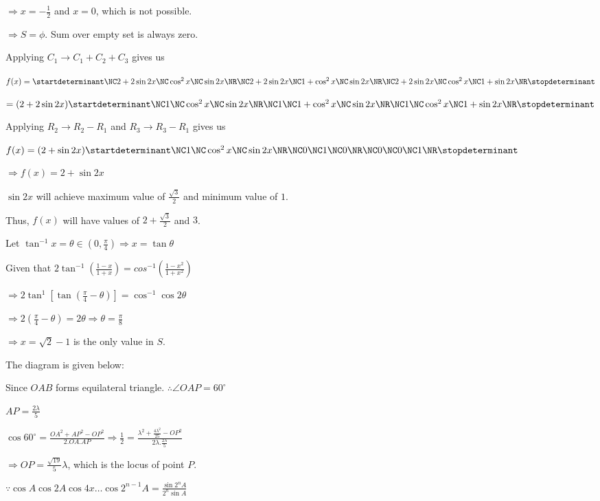   $\Rightarrow x = -\frac{1}{2}$ and $x = 0$, which is not possible.

  $\Rightarrow S = \phi$. Sum over empty set is always zero.
\item Applying $C_1\rightarrow C_1 + C_2 + C_3$ gives us

  $f(x) = \startdeterminant\NC 2 +2\sin2x\NC \cos^2x\NC\sin2x\NR\NC 2 + 2\sin2x\NC 1
  + \cos^2x\NC\sin2x \NR\NC 2 + 2\sin2x\NC \cos^2x\NC 1 + \sin2x\NR\stopdeterminant$

  $= (2 + 2\sin2x)\startdeterminant\NC 1\NC \cos^2x\NC\sin2x\NR\NC 1\NC 1
  + \cos^2x\NC\sin2x \NR\NC 1\NC \cos^2x\NC 1 + \sin2x\NR\stopdeterminant$

  Applying $R_2\rightarrow R_2 - R_1$ and $R_3\rightarrow R_3 - R_1$ gives us

  $f(x) = (2 + \sin2x)\startdeterminant\NC 1\NC \cos^2x\NC \sin2x\NR\NC 0\NC 1\NC 0\NR\NC 0\NC 0\NC
  1\NR\stopdeterminant$

  $\Rightarrow f(x) = 2 + \sin2x$

  $\sin2x$ will achieve maximum value of $\frac{\sqrt{3}}{2}$ and minimum value of $1$.

  Thus, $f(x)$ will have values of $2 + \frac{\sqrt{3}}{2}$ and $3$.
\item Let $\tan^{-1}x = \theta\in\left(0, \frac{\pi}{4}\right)\Rightarrow x = \tan\theta$

  Given that $2\tan^{-1}\left(\frac{1 - x}{1 + x}\right)= cos^{-1}\left(\frac{1 - x^2}{1 + x^2}\right)$

  $\Rightarrow 2\tan^{1}\left[\tan\left(\frac{\pi}{4} - \theta\right)\right] = \cos^{-1}\cos2\theta$

  $\Rightarrow 2\left(\frac{\pi}{4} - \theta\right) = 2\theta \Rightarrow \theta = \frac{\pi}{8}$

  $\Rightarrow x = \sqrt{2} - 1$ is the only value in $S$.
\item The diagram is given below:

  \startplacefigure
    \externalfigure[17_31.pdf]
  \stopplacefigure

  Since $OAB$ forms equilateral triangle. $\therefore \angle OAP = 60^\circ$

  $AP = \frac{2\lambda}{5}$

  $\cos60^\circ = \frac{OA^2 + AP^2 - OP^2}{2.OA.AP} \Rightarrow \frac{1}{2} = \frac{\lambda^2
    + \frac{4\lambda^2}{25} - OP^2}{2\lambda.\frac{2\lambda}{5}}$

  $\Rightarrow OP = \frac{\sqrt{19}}{5}\lambda$, which is the locus of point $P$.
\item $\because \cos A\cos2A\cos4x\ldots\cos2^{n - 1}A = \frac{\sin2^nA}{2^n\sin A}$

